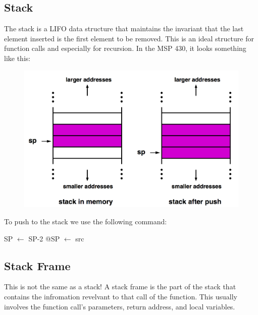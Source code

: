 \documentclass{hw}
\begin{document}
\subsection{Stack}
The stack is a LIFO data structure that maintains the invariant that the last 
element inserted is the first element to be removed. This is an ideal structure
for function calls and especially for recursion. In the MSP 430, it looks something
like this:
\begin{figure}[H]
  \centering
  \includegraphics[scale=.4]{stack}
\end{figure}
To push to the stack we use the following command:
\begin{C}
  SP $\leftarrow$ SP-2
  @SP $\leftarrow$ src
\end{C}

\subsection{Stack Frame}
This is not the same as a stack! A stack frame is the part of the stack that contains
the infromation revelvant to that call of the function. This usually involves the
function call's parameters, return address, and local variables.
\end{document}
